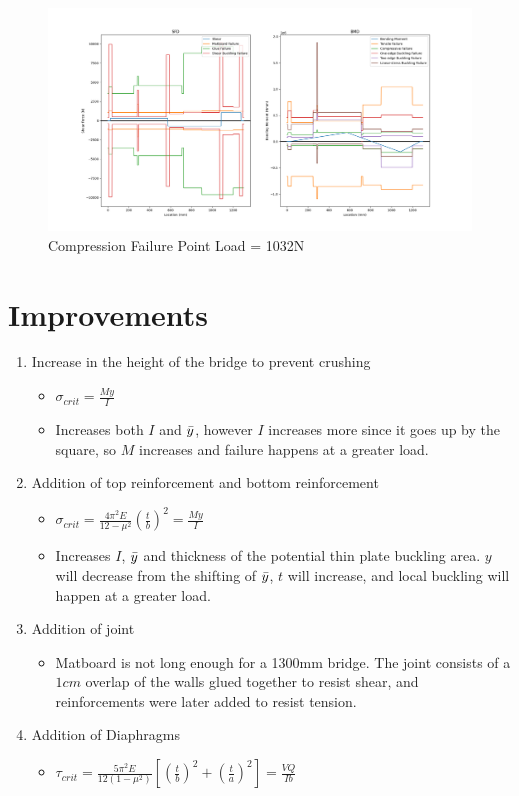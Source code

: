 \documentclass[11pt,twocolumn,letterpaper]{article}
\begin{document}
\begin{figure}[ht!]
  \centering
    \includegraphics[width=.4\textwidth]{figures/SBPointFail.png}
    \caption {Compression Failure Point Load = 1032N}
  \hfill
\end{figure}

\section*{Improvements}
\begin{enumerate}
    \item Increase in the height of the bridge to prevent crushing
    \begin{itemize}
        \item $\sigma_{crit} = \frac{My}{I}$
        \item Increases both $I$ and $\Bar{y}$, however $I$ increases more since it goes up by the square, so $M$ increases and failure happens at a greater load.
    \end{itemize}
    \item Addition of top reinforcement and bottom reinforcement
    \begin{itemize}
        \item $\sigma_{crit} = \frac{4\pi^2E}{12-\mu^2}\left(\frac{t}{b}\right)^2 = \frac{My}{I}$
        \item Increases $I$, $\Bar{y}$ and thickness of the potential thin plate buckling area. $y$ will decrease from the shifting of $\Bar{y}$, $t$ will increase, and local buckling will happen at a greater load. 
    \end{itemize}
    \item Addition of joint
    \begin{itemize}
        \item Matboard is not long enough for a 1300mm bridge. The joint consists of a $1\si{cm}$ overlap of the walls glued together to resist shear, and reinforcements were later added to resist tension.
    \end{itemize}
    \item Addition of Diaphragms
    \begin{itemize}
        \item $\tau_{crit} = \frac{5\pi^2E}{12(1-\mu^2)}\left[\left(\frac{t}{b}\right)^2+\left(\frac{t}{a}\right)^2\right] = \frac{VQ}{Ib}$

\end{itemize}
\end{enumerate}
\end{document}
